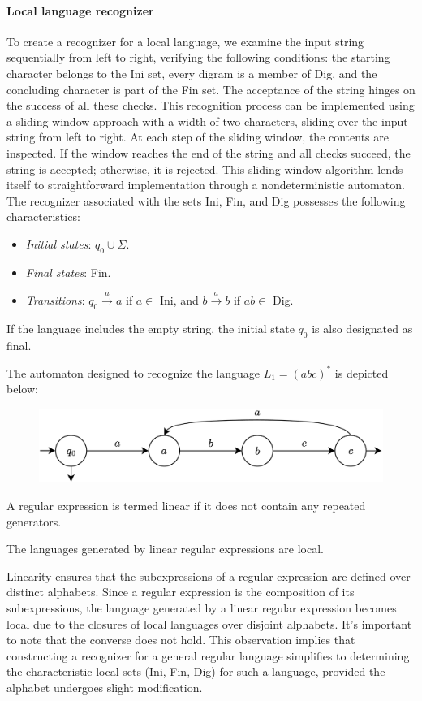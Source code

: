 \paragraph*{Local language recognizer}
To create a recognizer for a local language, we examine the input string sequentially from left to right, verifying the following conditions: the starting character belongs to the Ini set, every digram is a member of Dig, and the concluding character is part of the Fin set. 
The acceptance of the string hinges on the success of all these checks.
This recognition process can be implemented using a sliding window approach with a width of two characters, sliding over the input string from left to right. 
At each step of the sliding window, the contents are inspected. 
If the window reaches the end of the string and all checks succeed, the string is accepted; otherwise, it is rejected. 
This sliding window algorithm lends itself to straightforward implementation through a nondeterministic automaton.
The recognizer associated with the sets Ini, Fin, and Dig possesses the following characteristics:
\begin{itemize}
    \item \textit{Initial states}: $q_0 \cup \Sigma$.
    \item \textit{Final states}: Fin.
    \item \textit{Transitions}: $q_0 \overset{a}{\rightarrow}a$ if $a \in$ Ini, and $b \overset{a}{\rightarrow}b$ if $ab \in$ Dig.
\end{itemize}
If the language includes the empty string, the initial state $q_0$ is also designated as final.
\begin{example}
    The automaton designed to recognize the language $L_1=(abc)^{\ast}$ is depicted below: 
    \begin{figure}[H]
        \centering
        \includegraphics[width=0.75\linewidth]{images/local.png}
    \end{figure}
\end{example}
\begin{definition}
    A regular expression is termed linear if it does not contain any repeated generators.
\end{definition}
\begin{property}
    The languages generated by linear regular expressions are local. 
\end{property}
Linearity ensures that the subexpressions of a regular expression are defined over distinct alphabets. 
Since a regular expression is the composition of its subexpressions, the language generated by a linear regular expression becomes local due to the closures of local languages over disjoint alphabets. 
It's important to note that the converse does not hold.
This observation implies that constructing a recognizer for a general regular language simplifies to determining the characteristic local sets (Ini, Fin, Dig) for such a language, provided the alphabet undergoes slight modification.

